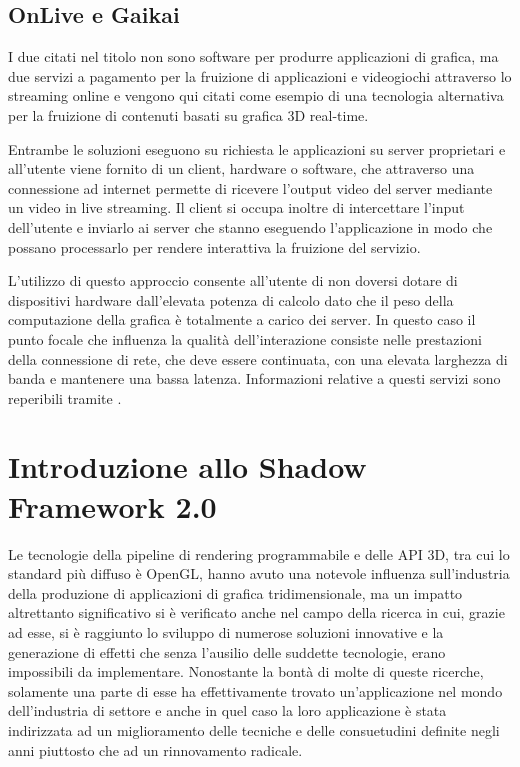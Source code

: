 \subsection{OnLive e Gaikai}
I due citati nel titolo non sono software per produrre applicazioni di grafica, ma due servizi a pagamento per la fruizione di applicazioni e videogiochi attraverso lo streaming online e vengono qui citati come esempio di una tecnologia alternativa per la fruizione di contenuti basati su grafica 3D real-time. 

Entrambe le soluzioni eseguono su richiesta le applicazioni su server proprietari e all'utente viene fornito di un client, hardware o software, che attraverso una connessione ad internet permette di ricevere l'output video del server mediante un video in live streaming. Il client si occupa inoltre di intercettare l'input dell'utente e inviarlo ai server che stanno eseguendo l'applicazione in modo che possano processarlo per rendere interattiva la fruizione del servizio.

L'utilizzo di questo approccio consente all'utente di non doversi dotare di dispositivi hardware dall'elevata potenza di calcolo dato che il peso della computazione della grafica \`e totalmente a carico dei server. In questo caso il punto focale che influenza la qualit\`a dell'interazione consiste nelle prestazioni della connessione di rete, che deve essere continuata, con una elevata larghezza di banda e mantenere una bassa latenza.
Informazioni relative a questi servizi sono reperibili tramite \cite{site:onlive,site:gaikai}.

\section{Introduzione allo Shadow Framework 2.0}
\label{sec:sfintro}
Le tecnologie della pipeline di rendering programmabile e delle \ac{API} 3D, tra cui lo standard pi\`u diffuso \`e OpenGL, hanno avuto una notevole influenza sull'industria della produzione di applicazioni di grafica tridimensionale, ma un impatto altrettanto significativo si \`e verificato anche nel campo della ricerca in cui, grazie ad esse, si \`e raggiunto lo sviluppo di numerose soluzioni innovative e la generazione di effetti che senza l'ausilio delle suddette tecnologie, erano impossibili da implementare.
Nonostante la bont\`a di molte di queste ricerche, solamente una parte di esse ha effettivamente trovato un'applicazione nel mondo dell'industria di settore e anche in quel caso la loro applicazione \`e stata indirizzata ad un miglioramento delle tecniche e delle consuetudini definite negli anni piuttosto che ad un rinnovamento radicale.

